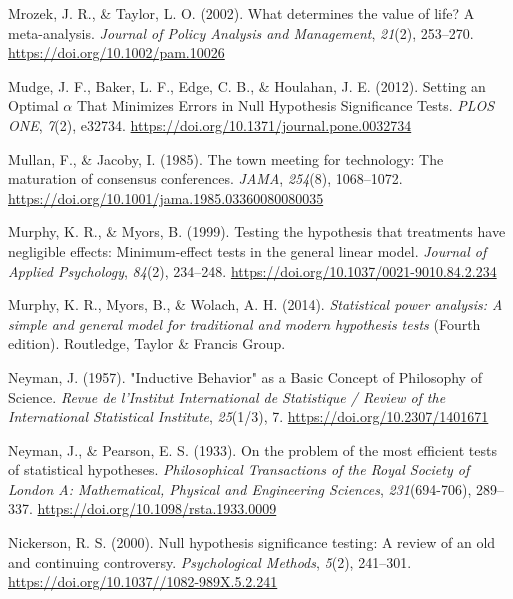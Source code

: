 \documentclass[
  letterpaper,
  DIV=11,
  numbers=noendperiod]{scrreprt}
\newlength{\cslhangindent}
\newlength{\cslentryspacingunit} %
\newenvironment{CSLReferences}[2] %
 {%
  \setlength{\parindent}{0pt}
  \ifodd #1
  \let\oldpar\par
  \def\par{\hangindent=\cslhangindent\oldpar}
  \fi
  \setlength{\parskip}{#2\cslentryspacingunit}
 }%
 {}
\begin{document}
\begin{CSLReferences}{1}{0}
\leavevmode{}%
Mrozek, J. R., \& Taylor, L. O. (2002). What determines the value of
life? A meta-analysis. \emph{Journal of Policy Analysis and Management},
\emph{21}(2), 253--270. \url{https://doi.org/10.1002/pam.10026}

\leavevmode{}%
Mudge, J. F., Baker, L. F., Edge, C. B., \& Houlahan, J. E. (2012).
Setting an {Optimal} {\(\alpha\)} {That Minimizes Errors} in {Null
Hypothesis Significance Tests}. \emph{PLOS ONE}, \emph{7}(2), e32734.
\url{https://doi.org/10.1371/journal.pone.0032734}

\leavevmode{}%
Mullan, F., \& Jacoby, I. (1985). The town meeting for technology: {The}
maturation of consensus conferences. \emph{JAMA}, \emph{254}(8),
1068--1072. \url{https://doi.org/10.1001/jama.1985.03360080080035}

\leavevmode{}%
Murphy, K. R., \& Myors, B. (1999). Testing the hypothesis that
treatments have negligible effects: {Minimum-effect} tests in the
general linear model. \emph{Journal of Applied Psychology},
\emph{84}(2), 234--248. \url{https://doi.org/10.1037/0021-9010.84.2.234}

\leavevmode{}%
Murphy, K. R., Myors, B., \& Wolach, A. H. (2014). \emph{Statistical
power analysis: A simple and general model for traditional and modern
hypothesis tests} (Fourth edition). {Routledge, Taylor \& Francis
Group}.

\leavevmode{}%
Neyman, J. (1957). "{Inductive Behavior}" as a {Basic Concept} of
{Philosophy} of {Science}. \emph{Revue de l'Institut International de
Statistique / Review of the International Statistical Institute},
\emph{25}(1/3), 7. \url{https://doi.org/10.2307/1401671}

\leavevmode{}%
Neyman, J., \& Pearson, E. S. (1933). On the problem of the most
efficient tests of statistical hypotheses. \emph{Philosophical
Transactions of the Royal Society of London A: Mathematical, Physical
and Engineering Sciences}, \emph{231}(694-706), 289--337.
\url{https://doi.org/10.1098/rsta.1933.0009}

\leavevmode{}%
Nickerson, R. S. (2000). Null hypothesis significance testing: {A}
review of an old and continuing controversy. \emph{Psychological
Methods}, \emph{5}(2), 241--301.
\url{https://doi.org/10.1037//1082-989X.5.2.241}


\end{CSLReferences}
\end{document}

